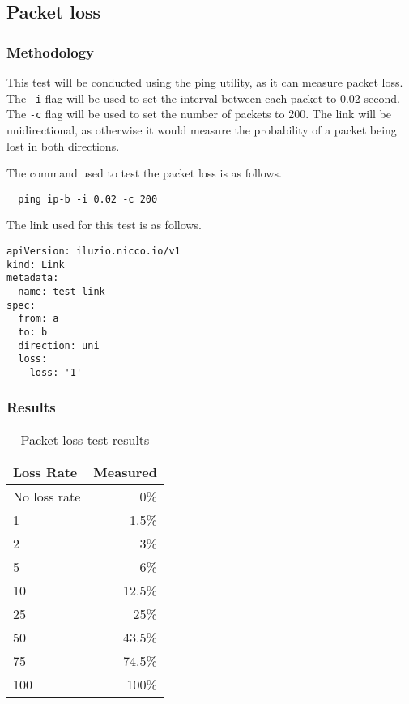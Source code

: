 \subsection{Packet loss}

\subsubsection{Methodology}

This test will be conducted using the ping utility, as it can measure packet loss.
The \verb|-i| flag will be used to set the interval between each packet to 0.02 second.
The \verb|-c| flag will be used to set the number of packets to 200.
The link will be unidirectional, as otherwise it would measure the probability of a packet being lost in both directions.

The command used to test the packet loss is as follows.

\begin{verbatim}
  ping ip-b -i 0.02 -c 200
\end{verbatim}

The link used for this test is as follows.

\begin{verbatim}
apiVersion: iluzio.nicco.io/v1
kind: Link
metadata:
  name: test-link
spec:
  from: a
  to: b
  direction: uni
  loss:
    loss: '1'
\end{verbatim}

\subsubsection{Results}


\begin{table}[h]
  \centering
  \begin{tabular}{|l|r|}
    \hline
    Loss Rate    & Measured \\
    \hline\hline
    No loss rate & 0\%      \\ \hline
    1            & 1.5\%    \\ \hline
    2            & 3\%      \\ \hline
    5            & 6\%      \\ \hline
    10           & 12.5\%   \\ \hline
    25           & 25\%     \\ \hline
    50           & 43.5\%   \\ \hline
    75           & 74.5\%   \\ \hline
    100          & 100\%    \\ \hline
  \end{tabular}
  \caption{Packet loss test results}
  \label{table:evaluation-packet-loss}
\end{table}

